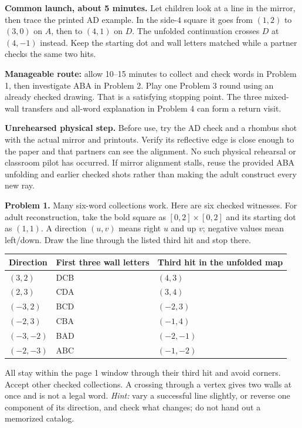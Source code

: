 \documentclass[11pt,letterpaper]{article}
\newcommand{\sectiontitle}[1]{\par\vspace{4pt}{\large\bfseries #1}\par}
\newcommand{\answer}[1]{\par\vspace{3pt}\textbf{Problem #1.} }
\begin{document}
\textbf{Common launch, about 5 minutes.} Let children look at a line in the mirror, then trace the printed AD example. In the side-$4$ square it goes from $(1,2)$ to $(3,0)$ on $A$, then to $(4,1)$ on $D$. The unfolded continuation crosses $D$ at $(4,-1)$ instead. Keep the starting dot and wall letters matched while a partner checks the same two hits.

\textbf{Manageable route:} allow 10--15 minutes to collect and check words in Problem 1, then investigate ABA in Problem 2. Play one Problem 3 round using an already checked drawing. That is a satisfying stopping point. The three mixed-wall transfers and all-word explanation in Problem 4 can form a return visit.

\textbf{Unrehearsed physical step.} Before use, try the AD check and a rhombus shot with the actual mirror and printouts. Verify its reflective edge is close enough to the paper and that partners can see the alignment. No such physical rehearsal or classroom pilot has occurred. If mirror alignment stalls, reuse the provided ABA unfolding and earlier checked shots rather than making the adult construct every new ray.
\newpage
\sectiontitle{Answers and optional hints}
\answer{1} Many six-word collections work. Here are six checked witnesses. For adult reconstruction, take the bold square as $[0,2]\times[0,2]$ and its starting dot as $(1,1)$. A direction $(u,v)$ means right $u$ and up $v$; negative values mean left/down. Draw the line through the listed third hit and stop there.
\begin{center}\renewcommand{\arraystretch}{1.25}
\begin{tabular}{@{}lll@{}}
Direction & First three wall letters & Third hit in the unfolded map\\\hline
$(3,2)$ & DCB & $(4,3)$\\
$(2,3)$ & CDA & $(3,4)$\\
$(-3,2)$ & BCD & $(-2,3)$\\
$(-2,3)$ & CBA & $(-1,4)$\\
$(-3,-2)$ & BAD & $(-2,-1)$\\
$(-2,-3)$ & ABC & $(-1,-2)$
\end{tabular}\end{center}
All stay within the page 1 window through their third hit and avoid corners. Accept other checked collections. A crossing through a vertex gives two walls at once and is not a legal word. \textit{Hint:} vary a successful line slightly, or reverse one component of its direction, and check what changes; do not hand out a memorized catalog.
\end{document}
